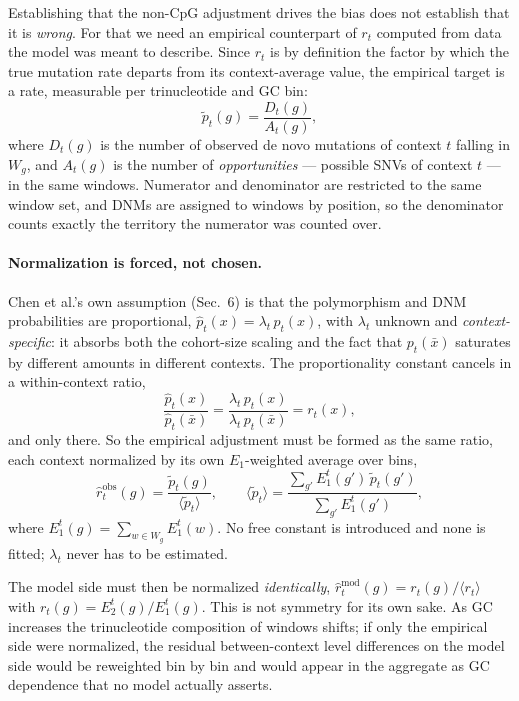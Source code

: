 \documentclass{article}
\begin{document}
Establishing that the non-CpG adjustment drives the bias does not establish that
it is \emph{wrong}. For that we need an empirical counterpart of $r_t$ computed
from data the model was meant to describe. Since $r_t$ is by definition the factor
by which the true mutation rate departs from its context-average value, the
empirical target is a rate, measurable per trinucleotide and GC bin:
\begin{equation}
    \tilde{p}_t(g) = \frac{D_t(g)}{A_t(g)},
    \label{eq:emp_rate}
\end{equation}
where $D_t(g)$ is the number of observed de novo mutations of context $t$ falling
in $W_g$, and $A_t(g)$ is the number of \emph{opportunities} --- possible SNVs of
context $t$ --- in the same windows. Numerator and denominator are restricted to
the same window set, and DNMs are assigned to windows by position, so the
denominator counts exactly the territory the numerator was counted over.

\paragraph{Normalization is forced, not chosen.} Chen et al.'s own assumption
(Sec.~6) is that the polymorphism and DNM probabilities are proportional,
$\hat{p}_t(x) = \lambda_t\, p_t(x)$, with $\lambda_t$ unknown and
\emph{context-specific}: it absorbs both the cohort-size scaling and the fact that
$p_t(\bar{x})$ saturates by different amounts in different contexts. The
proportionality constant cancels in a within-context ratio,
\begin{equation}
    \frac{\hat{p}_t(x)}{\hat{p}_t(\bar{x})}
    = \frac{\lambda_t\, p_t(x)}{\lambda_t\, p_t(\bar{x})}
    = r_t(x),
\end{equation}
and only there. So the empirical adjustment must be formed as the same ratio,
each context normalized by its own $E_1$-weighted average over bins,
\begin{equation}
    \hat{r}^{\mathrm{obs}}_t(g) = \frac{\tilde{p}_t(g)}{\langle \tilde{p}_t\rangle},
    \qquad
    \langle \tilde{p}_t\rangle
      = \frac{\sum_{g'} E_1^{t}(g')\, \tilde{p}_t(g')}{\sum_{g'} E_1^{t}(g')},
    \label{eq:emp_norm}
\end{equation}
where $E_1^t(g) = \sum_{w \in W_g} E_1^t(w)$. No free constant is introduced and
none is fitted; $\lambda_t$ never has to be estimated.

The model side must then be normalized \emph{identically},
$\hat{r}^{\mathrm{mod}}_t(g) = r_t(g) / \langle r_t \rangle$ with
$r_t(g) = E_2^{t}(g)/E_1^{t}(g)$. This is not symmetry for its own sake. As GC
increases the trinucleotide composition of windows shifts; if only the empirical
side were normalized, the residual between-context level differences on the model
side would be reweighted bin by bin and would appear in the aggregate as GC
dependence that no model actually asserts.
\end{document}
